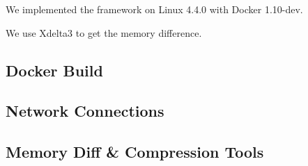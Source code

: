 

We implemented the framework on Linux 4.4.0 with Docker 1.10-dev. 

We use Xdelta3 to get the memory difference.

\subsection{Docker Build}

\subsection{Network Connections}

\subsection{Memory Diff \& Compression Tools}
